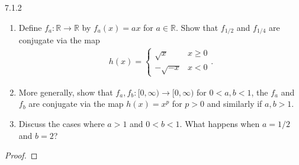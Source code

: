 \begin{problem}{7.1.2}
  \begin{enumerate}
    \item Define $f_a: \mathbb{R} \to \mathbb{R}$ by $f_a(x) = ax$ for $a\in\mathbb{R}$.
      Show that $f_{1/2}$ and $f_{1/4}$ are conjugate via the map
      \begin{align*}
        h(x) =
        \begin{cases}
          \sqrt{x} & x \geq 0 \\
          -\sqrt{-x} & x < 0
        \end{cases}.
      \end{align*}
    \item More generally, show that $f_a, f_b: [0, \infty) \to [0, \infty)$ for $0< a, b < 1$,
      the $f_a$ and $f_b$ are conjugate via the map $h(x) = x^p$ for $p > 0$ and similarly if $a, b > 1$.
    \item Discuss the cases where $a > 1$ and $0 < b < 1$. What happens when $a = 1/2$ and $b = 2$?
  \end{enumerate}
\end{problem}

\begin{proof}
\end{proof}
\newpage
